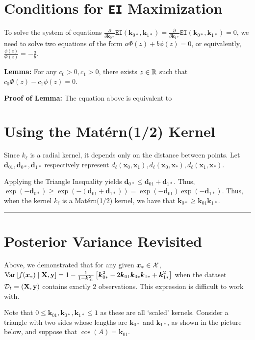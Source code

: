 \documentclass[11pt]{article}
\numberwithin{figure}{section}
\numberwithin{equation}{section}
\def\EI{\texttt{EI}}
\newcommand{\bs}[1]{\boldsymbol{#1}}
\def\bsx{\bs{x}}
\def\bsk{\bs{k}}
\def\bsd{\bs{d}}
\def\bell{\bs{\ell}}
\def\xast{\bsx_{*}}
\def\Matern{\textrm{Mat\'{e}rn}}
\begin{document}
\newpage 

\section{Conditions for \EI{} Maximization}

To solve the system of equations $\frac{\partial}{\partial \bsk_{0*}}\EI(\bsk_{0*}, \bsk_{1*}) = \frac{\partial}{\partial \bsk_{1*}}\EI(\bsk_{0*}, \bsk_{1*}) = 0$, we need to solve two equations of the form $a\Phi(z) + b\phi(z) = 0$, or equivalently, $\frac{\phi(z)}{\Phi(z)} = -\frac{a}{b}$.

\textbf{Lemma:} For any $c_0 > 0, c_1 > 0$, there exists $z \in \mathbb{R}$ such that $c_{0}\Phi(z) - c_{1}\phi(z) = 0$. 

\textbf{Proof of Lemma:} The equation above is equivalent to 

\newpage 

\section{Using the \Matern(1/2) Kernel}

Since $k_{\bell}$ is a radial kernel, it depends only on the distance between points. Let $\bsd_{01}, \bsd_{0*}, \bsd_{1*}$ respectively represent $d_{\bell}(\bsx_{0}, \bsx_{1}), d_{\bell}(\bsx_{0}, \xast), d_{\bell}(\bsx_{1}, \xast)$. 

Applying the Triangle Inequality yields $\bsd_{0*} \le \bsd_{01} + \bsd_{1*}$. Thus, $\exp(-\bsd_{0*}) \ge \exp\left(-\left(\bsd_{01} + \bsd_{1*}\right)\right) = \exp(-\bsd_{01})\exp(-\bsd_{1*})$. Thus, when the kernel $k_{\bell}$ is a \Matern(1/2) kernel, we have that $\bsk_{0*} \ge \bsk_{01}\bsk_{1*}$.
\noindent\rule{\textwidth}{0.8pt}

\newpage

\section{Posterior Variance Revisited}
Above, we demonstrated that for any given $\xast \in \calX$, $\var{f(\xast) \mid \mathbf{X}, \mathbf{y}} = 1 - \frac{1}{1 - \bsk_{01}^{2}}\left[\bsk_{0*}^{2} - 2\bsk_{01}\bsk_{0*}\bsk_{1*} + \bsk_{1*}^{2}\right]$ when the dataset $\mathcal{D}_{t} = (\mathbf{X}, \mathbf{y})$ contains exactly 2 observations. This expression is difficult to work with.

Note that $0 \le \bsk_{01}, \bsk_{0*}, \bsk_{1*} \le 1$ as these are all `scaled' kernels. Consider a triangle with two sides whose lengths are $\bsk_{0*}$ and $\bsk_{1*}$, as shown in the picture below, and suppose that $\cos(A) = \bsk_{01}$.
\end{document}
